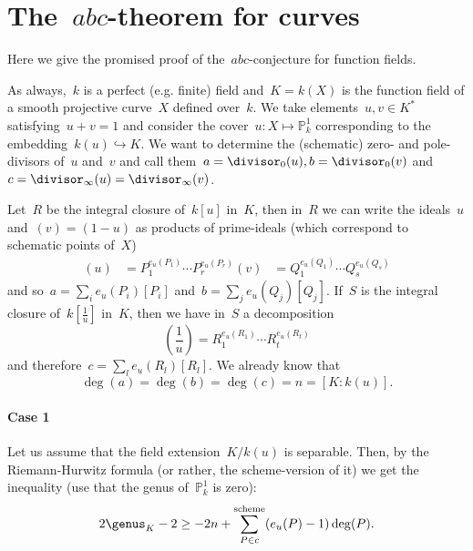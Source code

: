 \section{The~$abc$-theorem for curves}
Here we give the promised proof of the~$abc$-conjecture for function fields.

As always,~$k$ is a perfect (e.g. finite) field and~$K=k(X)$ is the function field of a smooth projective curve~$X$ defined over~$k$. We take elements~$u,v \in K^*$ satisfying~$u+v=1$ and consider the cover~$u\colon X \mapsto \mathbb{P}^1_k$ corresponding to the embedding~$k(u) \hookrightarrow K$. We want to determine the (schematic) zero- and pole-divisors of~$u$ and~$v$ and call them~$a=\divisor_0(u), b=\divisor_0(v)$ and~$c=\divisor_{\infty}(u)=\divisor_{\infty}(v)$.

Let~$R$ be the integral closure of~$k[u]$ in~$K$, then in~$R$ we can write the ideals~$u$ and~$(v)=(1-u)$ as products of prime-ideals (which correspond to schematic points of~$X$)
\begin{equation}
  \begin{aligned}
    (u) &= P_1^{e_u(P_1)} \cdots P_r^{e_u(P_r)}
    (v) &= Q_1^{e_u(Q_1)} \cdots Q_s^{e_u(Q_s)}
  \end{aligned}
\end{equation}
and so~$a = \sum_i e_u(P_i) [P_i]$ and~$b = \sum_j e_u(Q_j) [Q_j]$. If~$S$ is the integral closure of~$k[\frac{1}{u}]$ in~$K$, then we have in~$S$ a decomposition
\begin{equation}
  \left( \frac{1}{u} \right) = R_1^{e_u(R_1)} \cdots R_t^{e_u(R_t)}
\end{equation}
and therefore~$c = \sum_l e_u(R_l)[R_l]$. We already know that
\begin{equation}
  \deg(a)=\deg(b)=\deg(c)=n=[K : k(u)].
\end{equation}

\paragraph{Case 1} Let us assume that the field extension~$K/k(u)$ is separable. Then, by the Riemann-Hurwitz formula (or rather, the scheme-version of it) we get the inequality (use that the genus of~$\mathbb{P}^1_k$ is zero):
\begin{equation}
  2 \genus_K - 2 \geq -2n + \sum^{\textrm{scheme}}_{P \in c} (e_u(P)-1) \deg(P).
\end{equation}

